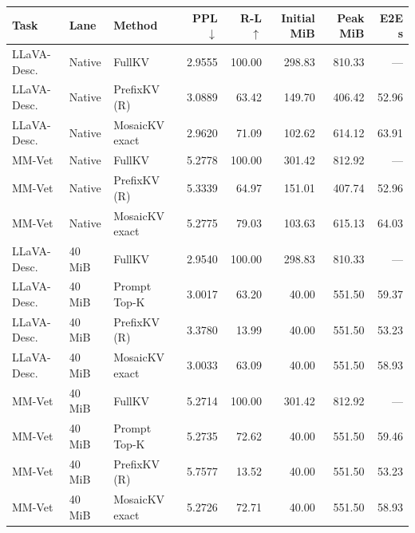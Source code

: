\begin{tabular}{lllrrrrr}
\toprule
Task & Lane & Method & PPL $\downarrow$ & R-L $\uparrow$ & Initial MiB & Peak MiB & E2E s\\\midrule
LLaVA-Desc. & Native & FullKV & 2.9555 & 100.00 & 298.83 & 810.33 & ---\\
LLaVA-Desc. & Native & PrefixKV (R) & 3.0889 & 63.42 & 149.70 & 406.42 & 52.96\\
LLaVA-Desc. & Native & MosaicKV exact & 2.9620 & 71.09 & 102.62 & 614.12 & 63.91\\
MM-Vet & Native & FullKV & 5.2778 & 100.00 & 301.42 & 812.92 & ---\\
MM-Vet & Native & PrefixKV (R) & 5.3339 & 64.97 & 151.01 & 407.74 & 52.96\\
MM-Vet & Native & MosaicKV exact & 5.2775 & 79.03 & 103.63 & 615.13 & 64.03\\
LLaVA-Desc. & 40 MiB & FullKV & 2.9540 & 100.00 & 298.83 & 810.33 & ---\\
LLaVA-Desc. & 40 MiB & Prompt Top-K & 3.0017 & 63.20 & 40.00 & 551.50 & 59.37\\
LLaVA-Desc. & 40 MiB & PrefixKV (R) & 3.3780 & 13.99 & 40.00 & 551.50 & 53.23\\
LLaVA-Desc. & 40 MiB & MosaicKV exact & 3.0033 & 63.09 & 40.00 & 551.50 & 58.93\\
MM-Vet & 40 MiB & FullKV & 5.2714 & 100.00 & 301.42 & 812.92 & ---\\
MM-Vet & 40 MiB & Prompt Top-K & 5.2735 & 72.62 & 40.00 & 551.50 & 59.46\\
MM-Vet & 40 MiB & PrefixKV (R) & 5.7577 & 13.52 & 40.00 & 551.50 & 53.23\\
MM-Vet & 40 MiB & MosaicKV exact & 5.2726 & 72.71 & 40.00 & 551.50 & 58.93\\
\bottomrule
\end{tabular}
